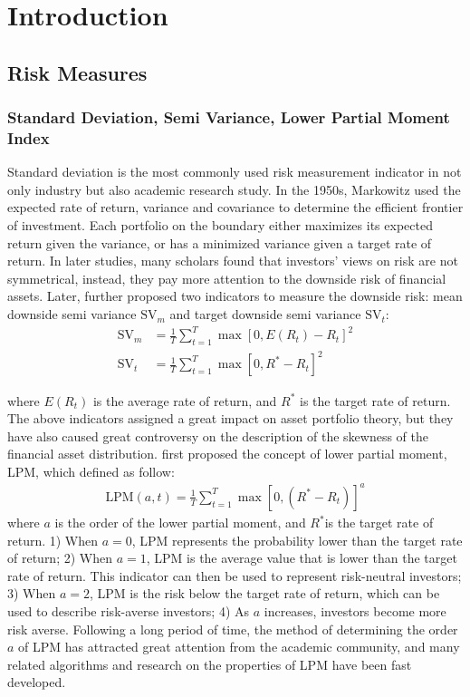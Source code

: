 \section{Introduction}
\subsection{Risk Measures}
\subsubsection{Standard Deviation, Semi Variance, Lower Partial Moment Index}
Standard deviation is the most commonly used risk measurement indicator in not only industry but also academic research study. In the 1950s, Markowitz used the expected rate of return, variance and covariance to determine the efficient frontier of investment. Each portfolio on the boundary either maximizes its expected return given the variance, or has a minimized variance given a target rate of return. In later studies, many scholars found that investors' views on risk are not symmetrical, instead, they pay more attention to the downside risk of financial assets. Later, \cite{MH1991} further proposed two indicators to measure the downside risk: mean downside semi variance $\text{SV}_{m}$ and target downside semi variance $\text{SV}_{t}$:
\begin{equation}
\begin{aligned}
    \text{SV}_{m} &= \frac{1}{T} \sum_{t=1}^T \max \left[0, E(R_{t})-R_{t}\right]^2 \\
    \text{SV}_{t} &=\frac{1}{T} \sum_{t=1}^T \max \left[0, R^*-R_t\right]^2
\end{aligned}        
\end{equation}

\noindent 
where $E(R_{t})$ is the average rate of return, and $R^*$ is the target rate of return.
The above indicators assigned a great impact on asset portfolio theory, but they have also caused great controversy on the description of the skewness of the financial asset distribution.
\cite{BV1975} first proposed the concept of lower partial moment, LPM, which defined as follow:
\begin{equation}
 \begin{aligned}
    \text{LPM}(a, t)=\frac{1}{T} \sum_{t=1}^T \max \left[0,\left(R^*-R_t\right)\right]^a
\end{aligned}       
\end{equation}
\noindent 
where $a$ is the order of the lower partial moment, and $R^*$is the target rate of return. 1) When $a=0$, LPM represents the probability lower than the target rate of return; 2) When $a=1$, LPM is the average value that is lower than the target rate of return. This indicator can then be used to represent risk-neutral investors; 3) When $a=2$, LPM is the risk below the target rate of return, which can be used to describe risk-averse investors; 4) As $a$ increases, investors become more risk averse. Following a long period of time, the method of determining the order $a$ of LPM has attracted great attention from the academic community, and many related algorithms and research on the properties of LPM have been fast developed.

